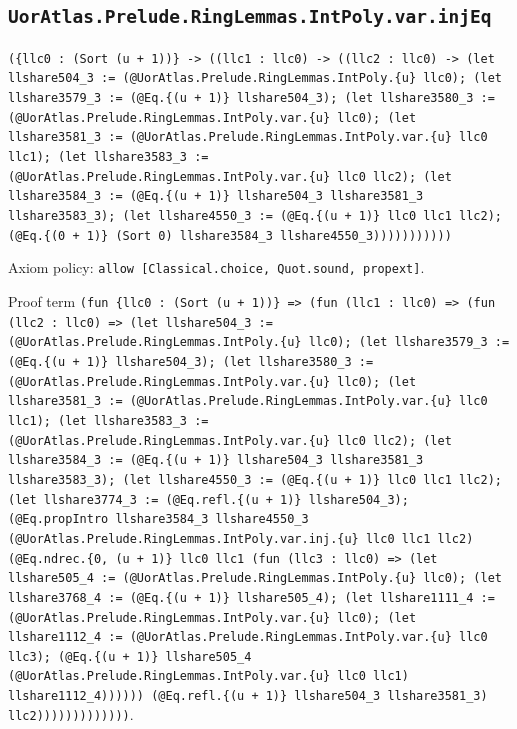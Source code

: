 \documentclass[11pt]{article}
\begin{document}
\subsection*{\texttt{UorAtlas.Prelude.RingLemmas.IntPoly.var.injEq}}
\noindent\texttt{(\{llc0 : (Sort (u + 1))\} -> ((llc1 : llc0) -> ((llc2 : llc0) -> (let llshare504\_3 := (@UorAtlas.Prelude.RingLemmas.IntPoly.\{u\} llc0); (let llshare3579\_3 := (@Eq.\{(u + 1)\} llshare504\_3); (let llshare3580\_3 := (@UorAtlas.Prelude.RingLemmas.IntPoly.var.\{u\} llc0); (let llshare3581\_3 := (@UorAtlas.Prelude.RingLemmas.IntPoly.var.\{u\} llc0 llc1); (let llshare3583\_3 := (@UorAtlas.Prelude.RingLemmas.IntPoly.var.\{u\} llc0 llc2); (let llshare3584\_3 := (@Eq.\{(u + 1)\} llshare504\_3 llshare3581\_3 llshare3583\_3); (let llshare4550\_3 := (@Eq.\{(u + 1)\} llc0 llc1 llc2); (@Eq.\{(0 + 1)\} (Sort 0) llshare3584\_3 llshare4550\_3)))))))))))}\par
\noindent Axiom policy: \texttt{allow [Classical.choice, Quot.sound, propext]}.\par
\noindent Proof term \texttt{(fun \{llc0 : (Sort (u + 1))\} => (fun (llc1 : llc0) => (fun (llc2 : llc0) => (let llshare504\_3 := (@UorAtlas.Prelude.RingLemmas.IntPoly.\{u\} llc0); (let llshare3579\_3 := (@Eq.\{(u + 1)\} llshare504\_3); (let llshare3580\_3 := (@UorAtlas.Prelude.RingLemmas.IntPoly.var.\{u\} llc0); (let llshare3581\_3 := (@UorAtlas.Prelude.RingLemmas.IntPoly.var.\{u\} llc0 llc1); (let llshare3583\_3 := (@UorAtlas.Prelude.RingLemmas.IntPoly.var.\{u\} llc0 llc2); (let llshare3584\_3 := (@Eq.\{(u + 1)\} llshare504\_3 llshare3581\_3 llshare3583\_3); (let llshare4550\_3 := (@Eq.\{(u + 1)\} llc0 llc1 llc2); (let llshare3774\_3 := (@Eq.refl.\{(u + 1)\} llshare504\_3); (@Eq.propIntro llshare3584\_3 llshare4550\_3 (@UorAtlas.Prelude.RingLemmas.IntPoly.var.inj.\{u\} llc0 llc1 llc2) (@Eq.ndrec.\{0, (u + 1)\} llc0 llc1 (fun (llc3 : llc0) => (let llshare505\_4 := (@UorAtlas.Prelude.RingLemmas.IntPoly.\{u\} llc0); (let llshare3768\_4 := (@Eq.\{(u + 1)\} llshare505\_4); (let llshare1111\_4 := (@UorAtlas.Prelude.RingLemmas.IntPoly.var.\{u\} llc0); (let llshare1112\_4 := (@UorAtlas.Prelude.RingLemmas.IntPoly.var.\{u\} llc0 llc3); (@Eq.\{(u + 1)\} llshare505\_4 (@UorAtlas.Prelude.RingLemmas.IntPoly.var.\{u\} llc0 llc1) llshare1112\_4)))))) (@Eq.refl.\{(u + 1)\} llshare504\_3 llshare3581\_3) llc2)))))))))))))}.\par
\end{document}
